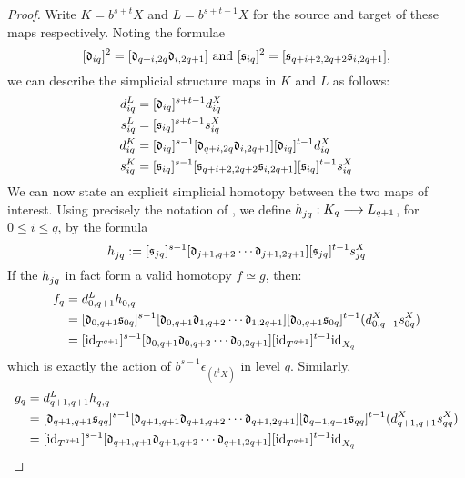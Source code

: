 \documentclass[11pt]{amsart}
\theoremstyle{plain}
\begin{document}
\begin{proof}
Write $K=b^{s+t}X$ and $L=b^{s+t-1}X$ for the source and target of these maps respectively. Noting the formulae
\[[\mathfrak{d}_{iq}]^2=[\mathfrak{d}_{q+i,2q}\relax\mathfrak{d}_{i,2q+1}]\ \textup{and}\  [\mathfrak{s}_{iq}]^2=[\mathfrak{s}_{q+i+2,2q+2}\relax\mathfrak{s}_{i,2q+1}],\]
we can describe the simplicial structure maps in $K$ and $L$ as follows:
\begin{alignat*}{2}
{d}_{\smash{iq}}^{\smash{L}}&=[\mathfrak{d}_{iq}]^{s+t-1}{d}_{\smash{iq}}^{\smash{X}}\\
{s}_{\smash{iq}}^{\smash{L}}&=[\mathfrak{s}_{iq}]^{s+t-1}{s}_{\smash{iq}}^{\smash{X}}\\
{d}_{\smash{iq}}^{\smash{K}}&=[\mathfrak{d}_{iq}]^{s-1}[\mathfrak{d}_{q+i,2q}\relax\mathfrak{d}_{i,2q+1}][\mathfrak{d}_{iq}]^{t-1}{d}_{\smash{iq}}^{\smash{X}}\\
{s}_{\smash{iq}}^{\smash{K}}&=[\mathfrak{s}_{iq}]^{s-1}[\mathfrak{s}_{q+i+2,2q+2}\relax\mathfrak{s}_{i,2q+1}][\mathfrak{s}_{iq}]^{t-1}{s}_{\smash{iq}}^{\smash{X}}
\end{alignat*}
We can now state an explicit simplicial homotopy between the two maps of interest. Using precisely the notation of \cite[\S5]{MaySimpObj.pdf}, we define ${h}_{\smash{jq}}^{\smash{}}:K_q\longrightarrow L_{q+1}$, for $0\leq i\leq q$, by the formula
\[{h}_{\smash{jq}}^{\smash{}}:=[\mathfrak{s}_{jq}]^{s-1}[\mathfrak{d}_{j+1,q+2}\relax\cdots \relax\mathfrak{d}_{j+1,2q+1}][\mathfrak{s}_{jq}]^{t-1}{s}_{\smash{jq}}^{\smash{X}}\]
If the ${h}_{\smash{jq}}^{\smash{}}$ in fact form a valid homotopy $f\simeq g$, then: %
\begin{alignat*}{2}
f_q&=\trip{d}{0,q+1}{L}\trip{h}{0,q}{}\\
&=
[\frakd_{0,q+1}\fraks_{0q}]^{s-1}[\frakd_{0,q+1}\frakd_{1,q+2}\circ\cdots \circ\frakd_{1,2q+1}][\frakd_{0,q+1}\fraks_{0q}]^{t-1}(\trip{d}{0,q+1}{X}\trip{s}{0q}{X})%
\\
&=
[\trip{\textup{id}}{T^{q+1}}{}]^{s-1}[\frakd_{0,q+1}\frakd_{0,q+2}\circ\cdots \circ\frakd_{0,2q+1}][\trip{\textup{id}}{T^{q+1}}{}]^{t-1}\trip{\textup{id}}{X_q}{}%
\end{alignat*}
which is exactly the action of  $b^{s-1}\epsilon_{(b^{t}X)}$ in level $q$. Similarly,
\begin{alignat*}{2}
g_q&=\trip{d}{q+1,q+1}{L}\trip{h}{q,q}{}\\
&=
[\frakd_{q+1,q+1}\fraks_{qq}]^{s-1}[\frakd_{q+1,q+1}\frakd_{q+1,q+2}\circ\cdots \circ\frakd_{q+1,2q+1}][\frakd_{q+1,q+1}\fraks_{qq}]^{t-1}(\trip{d}{q+1,q+1}{X}\trip{s}{qq}{X})
\\
&=
[\trip{\textup{id}}{T^{q+1}}{}]^{s-1}[\frakd_{q+1,q+1}\frakd_{q+1,q+2}\circ\cdots \circ\frakd_{q+1,2q+1}][\trip{\textup{id}}{T^{q+1}}{}]^{t-1}\trip{\textup{id}}{X_q}{}%

\end{alignat*}
\end{proof}
\end{document}

